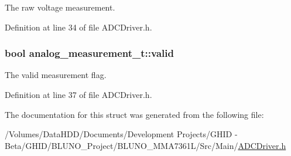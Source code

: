\-The raw voltage measurement. 



\-Definition at line 34 of file \-A\-D\-C\-Driver.\-h.

\hypertarget{structanalog__measurement__t_ade0e3bb116d6eb88e52fc6971b7ef23e}{
\subsubsection[{valid}]{\setlength{\rightskip}{0pt plus 5cm}bool {\bf analog\-\_\-measurement\-\_\-t\-::valid}}}\label{structanalog__measurement__t_ade0e3bb116d6eb88e52fc6971b7ef23e}


\-The valid measurement flag. 



\-Definition at line 37 of file \-A\-D\-C\-Driver.\-h.



\-The documentation for this struct was generated from the following file\-:\begin{DoxyCompactItemize}
\item 
/\-Volumes/\-Data\-H\-D\-D/\-Documents/\-Development Projects/\-G\-H\-I\-D -\/ Beta/\-G\-H\-I\-D/\-B\-L\-U\-N\-O\-\_\-\-Project/\-B\-L\-U\-N\-O\-\_\-\-M\-M\-A7361\-L/\-Src/\-Main/\hyperlink{_a_d_c_driver_8h}{\-A\-D\-C\-Driver.\-h}\end{DoxyCompactItemize}
